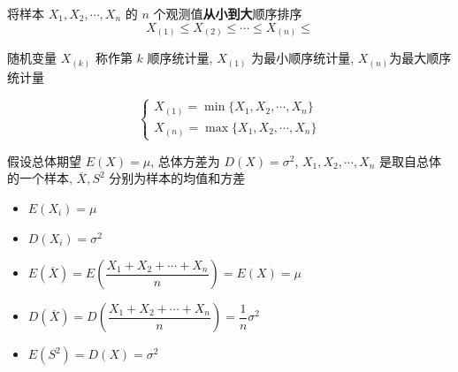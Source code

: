 \begin{definition}[顺序统计量]
	将样本 $X_{1}, X_{2}, \cdots, X_{n}$ 的 $n$ 个观测值\textbf{从小到大}顺序排序 
	$$X_{(1)} \leq X_{(2)} \leq \cdots \leq X_{(n)}\leq$$
	
	随机变量 $X_{(k)}$ 称作第 $k$ 顺序统计量, $X_{(1)}$ 为最小顺序统计量, $X_{(n)}$为最大顺序统计量

	$$\begin{cases}
		X_{(1)} = \min\{X_{1},X_{2},\cdots,X_{n}\}\\
		X_{(n)} = \max\{X_{1},X_{2},\cdots,X_{n}\}
	\end{cases}$$
\end{definition}
\begin{corollary}
	假设总体期望 $E(X)=\mu$, 总体方差为 $D(X) = \sigma^{2}$, $X_{1},X_{2},\cdots,X_{n}$ 是取自总体的一个样本, $\overline{X},S^{2}$ 分别为样本的均值和方差 
	\begin{itemize}
		\item $E(X_{i}) = \mu$
		\item $D(X_{i}) = \sigma^{2}$
		\item $E(\overline{X}) = E(\dfrac{X_{1}+X_{2}+\cdots+X_{n}}{n}) = E(X) = \mu$
		\item $D(\overline{X}) = D(\dfrac{X_{1}+X_{2}+\cdots+X_{n}}{n}) = \dfrac{1}{n}\sigma^{2}$
		\item $E(S^{2}) = D(X) = \sigma^{2}$
	\end{itemize}
\end{corollary}
